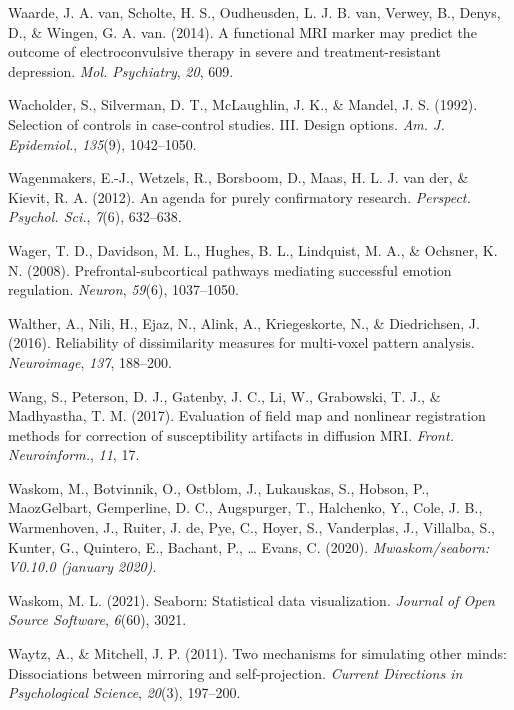 \documentclass[11pt,american,a4paper,oneside,]{memoir} %
\begin{document}
\leavevmode\hypertarget{ref-Van_Waarde2014-sh}{}%
Waarde, J. A. van, Scholte, H. S., Oudheusden, L. J. B. van, Verwey, B., Denys, D., \& Wingen, G. A. van. (2014). A functional MRI marker may predict the outcome of electroconvulsive therapy in severe and treatment-resistant depression. \emph{Mol. Psychiatry}, \emph{20}, 609.

\leavevmode\hypertarget{ref-Wacholder1992-wb}{}%
Wacholder, S., Silverman, D. T., McLaughlin, J. K., \& Mandel, J. S. (1992). Selection of controls in case-control studies. III. Design options. \emph{Am. J. Epidemiol.}, \emph{135}(9), 1042--1050.

\leavevmode\hypertarget{ref-Wagenmakers2012-vd}{}%
Wagenmakers, E.-J., Wetzels, R., Borsboom, D., Maas, H. L. J. van der, \& Kievit, R. A. (2012). An agenda for purely confirmatory research. \emph{Perspect. Psychol. Sci.}, \emph{7}(6), 632--638.

\leavevmode\hypertarget{ref-wager2008prefrontal}{}%
Wager, T. D., Davidson, M. L., Hughes, B. L., Lindquist, M. A., \& Ochsner, K. N. (2008). Prefrontal-subcortical pathways mediating successful emotion regulation. \emph{Neuron}, \emph{59}(6), 1037--1050.

\leavevmode\hypertarget{ref-Walther2016-je}{}%
Walther, A., Nili, H., Ejaz, N., Alink, A., Kriegeskorte, N., \& Diedrichsen, J. (2016). Reliability of dissimilarity measures for multi-voxel pattern analysis. \emph{Neuroimage}, \emph{137}, 188--200.

\leavevmode\hypertarget{ref-Wang2017-nk}{}%
Wang, S., Peterson, D. J., Gatenby, J. C., Li, W., Grabowski, T. J., \& Madhyastha, T. M. (2017). Evaluation of field map and nonlinear registration methods for correction of susceptibility artifacts in diffusion MRI. \emph{Front. Neuroinform.}, \emph{11}, 17.

\leavevmode\hypertarget{ref-Waskom2020-qq}{}%
Waskom, M., Botvinnik, O., Ostblom, J., Lukauskas, S., Hobson, P., MaozGelbart, Gemperline, D. C., Augspurger, T., Halchenko, Y., Cole, J. B., Warmenhoven, J., Ruiter, J. de, Pye, C., Hoyer, S., Vanderplas, J., Villalba, S., Kunter, G., Quintero, E., Bachant, P., \ldots{} Evans, C. (2020). \emph{Mwaskom/seaborn: V0.10.0 (january 2020)}.

\leavevmode\hypertarget{ref-waskom2021seaborn}{}%
Waskom, M. L. (2021). Seaborn: Statistical data visualization. \emph{Journal of Open Source Software}, \emph{6}(60), 3021.

\leavevmode\hypertarget{ref-waytz2011two}{}%
Waytz, A., \& Mitchell, J. P. (2011). Two mechanisms for simulating other minds: Dissociations between mirroring and self-projection. \emph{Current Directions in Psychological Science}, \emph{20}(3), 197--200.
\end{document}
